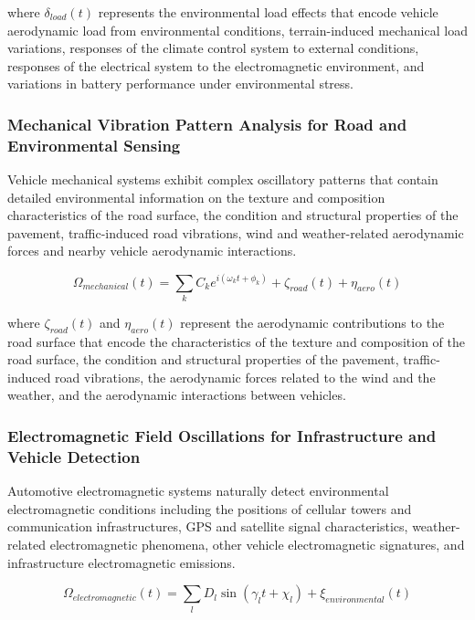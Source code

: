 \documentclass[12pt,a4paper]{article}
\begin{document}
where $\delta_{load}(t)$ represents the environmental load effects that encode vehicle aerodynamic load from environmental conditions, terrain-induced mechanical load variations, responses of the climate control system to external conditions, responses of the electrical system to the electromagnetic environment, and variations in battery performance under environmental stress.

\subsubsection{Mechanical Vibration Pattern Analysis for Road and Environmental Sensing}

Vehicle mechanical systems exhibit complex oscillatory patterns that contain detailed environmental information on the texture and composition characteristics of the road surface, the condition and structural properties of the pavement, traffic-induced road vibrations, wind and weather-related aerodynamic forces and nearby vehicle aerodynamic interactions.

\begin{equation}
\Omega_{mechanical}(t) = \sum_{k} C_k e^{i(\omega_k t + \phi_k)} + \zeta_{road}(t) + \eta_{aero}(t)
\end{equation}

where $\zeta_{road}(t)$ and $\eta_{aero}(t)$ represent the aerodynamic contributions to the road surface that encode the characteristics of the texture and composition of the road surface, the condition and structural properties of the pavement, traffic-induced road vibrations, the aerodynamic forces related to the wind and the weather, and the aerodynamic interactions between vehicles.

\subsubsection{Electromagnetic Field Oscillations for Infrastructure and Vehicle Detection}

Automotive electromagnetic systems naturally detect environmental electromagnetic conditions including the positions of cellular towers and communication infrastructures, GPS and satellite signal characteristics, weather-related electromagnetic phenomena, other vehicle electromagnetic signatures, and infrastructure electromagnetic emissions.

\begin{equation}
\Omega_{electromagnetic}(t) = \sum_{l} D_l \sin(\gamma_l t + \chi_l) + \xi_{environmental}(t)
\end{equation}
\end{document}
